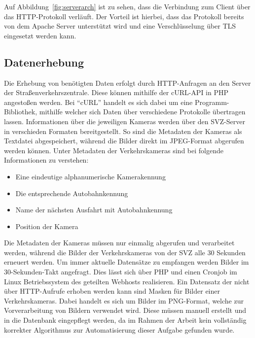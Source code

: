 Auf Abbildung~\ref{fig:serverarch} ist zu sehen, dass die Verbindung zum Client über das HTTP-Protokoll verläuft. Der Vorteil ist hierbei, dass das Protokoll bereits von dem Apache Server unterstützt wird und eine Verschlüsselung über TLS eingesetzt werden kann.
\subsection{Datenerhebung}
\label{sec:datenerhebung}
Die Erhebung von benötigten Daten erfolgt durch HTTP-Anfragen an den Server der Straßenverkehrszentrale. Diese können mithilfe der cURL-API in PHP angestoßen werden. Bei "`cURL"' handelt es sich dabei um eine Programm-Bibliothek, mithilfe welcher sich Daten über verschiedene Protokolle übertragen lassen. \newline
Informationen über die jeweiligen Kameras werden über den SVZ-Server in verschieden Formaten bereitgestellt. So sind die Metadaten der Kameras als Textdatei abgespeichert, während die Bilder direkt im JPEG-Format abgerufen werden können. Unter Metadaten der Verkehrskameras sind bei folgende Informationen zu verstehen: 
\begin{itemize}
\item{Eine eindeutige alphanumerische Kamerakennung}
\item{Die entsprechende Autobahnkennung}
\item{Name der nächsten Ausfahrt mit Autobahnkennung}
\item{Position der Kamera}
\end{itemize}
Die Metadaten der Kameras müssen nur einmalig abgerufen und verarbeitet werden, während die Bilder der Verkehrskameras von der SVZ alle 30 Sekunden erneuert werden. Um immer aktuelle Datensätze zu empfangen werden Bilder im 30-Sekunden-Takt angefragt. Dies lässt sich über PHP und einen Cronjob im Linux Betriebssystem des geteilten Webhosts realisieren.
Ein Datensatz der nicht über HTTP-Aufrufe erhoben werden kann sind Masken für Bilder einer Verkehrskameras.
Dabei handelt es sich um Bilder im PNG-Format, welche zur Vorverarbeitung von Bildern verwendet wird. Diese müssen manuell erstellt und in die Datenbank eingepflegt werden, da im Rahmen der Arbeit kein vollständig korrekter Algorithmus zur Automatisierung dieser Aufgabe gefunden wurde.

